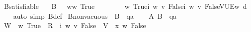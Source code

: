 \begin{isabellebody}
\isamarkupfalse%
\ {\isasymGamma}\isactrlsub B{\isacharunderscore}{\kern0pt}satisfiable{\isacharcolon}{\kern0pt}\isanewline
\ \ {\isachardoublequoteopen}{\isasymforall}{\isasymgamma}{\isachardot}{\kern0pt}\ {\isasymGamma}\isactrlsub B\ {\isasymgamma}\ {\isasymlongrightarrow}\ {\isacharparenleft}{\kern0pt}{\isasymforall}w{\isacharcolon}{\kern0pt}{\isacharparenleft}{\kern0pt}{\isasymlambda}w{\isacharcolon}{\kern0pt}{\isacharcolon}{\kern0pt}{\isasymw}{\isachardot}{\kern0pt}\ True{\isacharparenright}{\kern0pt}{\isachardot}{\kern0pt}\isanewline
\ \ \ \ \ \ \ \ {\isasymlangle}{\isacharparenleft}{\kern0pt}{\isasymlambda}w{\isacharcolon}{\kern0pt}{\isacharcolon}{\kern0pt}{\isasymw}{\isachardot}{\kern0pt}\ True{\isacharparenright}{\kern0pt}{\isacharcomma}{\kern0pt}{\isacharparenleft}{\kern0pt}{\isasymlambda}i\ w\ v{\isachardot}{\kern0pt}\ False{\isacharparenright}{\kern0pt}{\isacharcomma}{\kern0pt}{\isacharparenleft}{\kern0pt}{\isasymlambda}i\ w\ v{\isachardot}{\kern0pt}\ False{\isacharparenright}{\kern0pt}{\isacharcomma}{\kern0pt}V{\isacharcomma}{\kern0pt}U{\isacharcomma}{\kern0pt}E{\isasymrangle}{\isacharcomma}{\kern0pt}w\ {\isasymTurnstile}\isactrlsup d\ {\isasymgamma}{\isacharparenright}{\kern0pt}{\isachardoublequoteclose}\isanewline
%
\isadelimproof
\ \ %
\endisadelimproof
%
\isatagproof
{}\isamarkupfalse%
\ {\isacharparenleft}{\kern0pt}auto\ simp{\isacharcolon}{\kern0pt}\ {\isasymGamma}\isactrlsub B{\isacharunderscore}{\kern0pt}def{\isacharparenright}{\kern0pt}%
\endisatagproof
{\isafoldproof}%
%
\isadelimproof
\isanewline
%
\endisadelimproof
\isanewline
{}\isamarkupfalse%
\ {\isasymGamma}\isactrlsub B{\isacharunderscore}{\kern0pt}nonvacuous{\isacharcolon}{\kern0pt}\ {\isachardoublequoteopen}{\isasymnot}\ {\isacharparenleft}{\kern0pt}{\isasymGamma}\isactrlsub B\ {\isasymTurnstile}\ q\isactrlsup a{\isacharparenright}{\kern0pt}{\isachardoublequoteclose}\isanewline
%
\isadelimproof
%
\endisadelimproof
%
\isatagproof
{}\isamarkupfalse%
\isanewline
\ \ \isamarkupfalse%
\ A{\isacharcolon}{\kern0pt}\ {\isachardoublequoteopen}{\isasymGamma}\isactrlsub B\ {\isasymTurnstile}\ q\isactrlsup a{\isachardoublequoteclose}\isanewline
\ \ \isamarkupfalse%
\ {\isacharquery}{\kern0pt}W\ {\isacharequal}{\kern0pt}\ {\isachardoublequoteopen}{\isasymlambda}w{\isacharcolon}{\kern0pt}{\isacharcolon}{\kern0pt}{\isasymw}{\isachardot}{\kern0pt}\ True{\isachardoublequoteclose}\ \ {\isacharquery}{\kern0pt}R\ {\isacharequal}{\kern0pt}\ {\isachardoublequoteopen}{\isasymlambda}i\ w\ v{\isachardot}{\kern0pt}\ False{\isachardoublequoteclose}\ \ {\isacharquery}{\kern0pt}V\ {\isacharequal}{\kern0pt}\ {\isachardoublequoteopen}{\isasymlambda}x\ w{\isachardot}{\kern0pt}\ False{\isachardoublequoteclose}\isanewline

\end{isabellebody}
